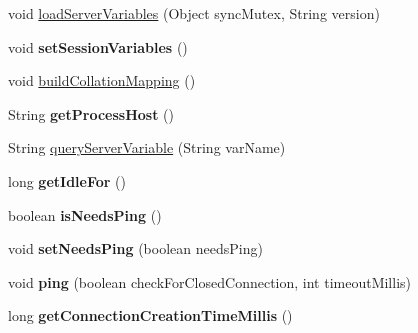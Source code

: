 \begin{DoxyCompactItemize}
\item 
void \mbox{\hyperlink{classcom_1_1mysql_1_1cj_1_1_native_session_af9eebdf7b6270a82f07d2cb4c2566ca6}{load\+Server\+Variables}} (Object sync\+Mutex, String version)
\item 
\mbox{\label{classcom_1_1mysql_1_1cj_1_1_native_session_a09162b4113f8e3d40a981090278f02f8}} 
void {\bfseries set\+Session\+Variables} ()
\item 
void \mbox{\hyperlink{classcom_1_1mysql_1_1cj_1_1_native_session_ad05f537e9c5212829c93ac8bc1b2ee91}{build\+Collation\+Mapping}} ()
\item 
\mbox{\label{classcom_1_1mysql_1_1cj_1_1_native_session_ad4fcecc07b825e551a6ba61534ef36d9}} 
String {\bfseries get\+Process\+Host} ()
\item 
String \mbox{\hyperlink{classcom_1_1mysql_1_1cj_1_1_native_session_ad2b81db7dba2a2a485e2a2063599863a}{query\+Server\+Variable}} (String var\+Name)
\item 
\mbox{\label{classcom_1_1mysql_1_1cj_1_1_native_session_acf4df7ee75428b73f8a04fad9ec79cd5}} 
long {\bfseries get\+Idle\+For} ()
\item 
\mbox{\label{classcom_1_1mysql_1_1cj_1_1_native_session_aa854ea4478e9d363583300405526c67f}} 
boolean {\bfseries is\+Needs\+Ping} ()
\item 
\mbox{\label{classcom_1_1mysql_1_1cj_1_1_native_session_abb7a8cffc568444d73d5009376cac2ac}} 
void {\bfseries set\+Needs\+Ping} (boolean needs\+Ping)
\item 
\mbox{\label{classcom_1_1mysql_1_1cj_1_1_native_session_a374846a5074ddfa646ee9a632cbb229a}} 
void {\bfseries ping} (boolean check\+For\+Closed\+Connection, int timeout\+Millis)
\item 
\mbox{\label{classcom_1_1mysql_1_1cj_1_1_native_session_a82035d07982c3fb563055e2711cb395b}} 
long {\bfseries get\+Connection\+Creation\+Time\+Millis} ()
\item 
\mbox{\label{classcom_1_1mysql_1_1cj_1_1_native_session_acdf7ae6fddc0c35f16946cbd017151f8}} 

\end{DoxyCompactItemize}
